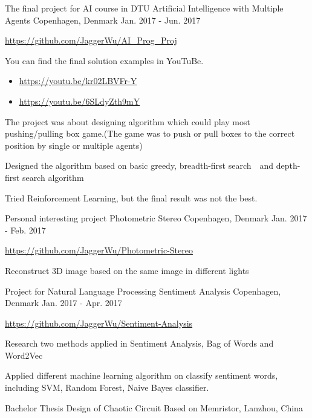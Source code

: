 \begin{cventries}
    {The final project for AI course in DTU}
    {Artificial Intelligence with Multiple Agents}
    {Copenhagen, Denmark}
    {Jan. 2017 - Jun. 2017}
    {
      \begin{cvitems}
        \item {\url{https://github.com/JaggerWu/AI_Prog_Proj}}
        \item {You can find the final solution examples in YouTuBe.
        \begin{itemize}
            \item \url{https://youtu.be/kr02LBVFr-Y}
            \item \url{https://youtu.be/6SLdyZth9mY}
        \end{itemize}}
        \item {The project was about designing algorithm which could play most pushing/pulling box game.(The game was to push or pull boxes to the correct position by single or multiple agents)}
        \item {Designed the algorithm based on basic greedy, breadth-first search　and depth-first search algorithm}
        \item {Tried Reinforcement Learning, but the final result was not the best.}
      \end{cvitems}
    }
  \cventry
    {Personal interesting project}
    {Photometric Stereo}
    {Copenhagen, Denmark}
    {Jan. 2017 - Feb. 2017}
    {
      \begin{cvitems}
        \item {\url{https://github.com/JaggerWu/Photometric-Stereo}}
        \item {Reconstruct 3D image based on the same image in different lights}
      \end{cvitems} 
    }
  \cventry
    {Project for Natural Language Processing}
    {Sentiment Analysis}
    {Copenhagen, Denmark}
    {Jan. 2017 - Apr. 2017}
    {
      \begin{cvitems}
        \item {\url{https://github.com/JaggerWu/Sentiment-Analysis}}
        \item {Research two methods applied in Sentiment Analysis, Bag of Words and Word2Vec}
        \item {Applied different machine learning algorithm on classify sentiment words, including SVM, Random Forest, Naive Bayes classifier.}
      \end{cvitems} 
    }
  \cventry
    {Bachelor Thesis}
    {Design of Chaotic Circuit Based on Memristor,}
    {Lanzhou, China}

\end{cventries}
